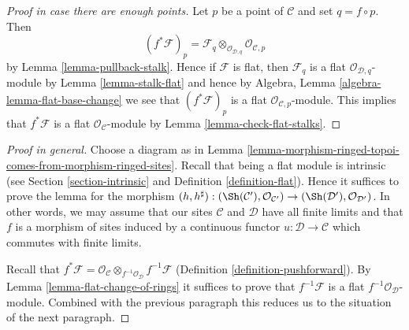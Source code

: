 \begin{proof}[Proof in case there are enough points]
Let $p$ be a point of $\mathcal{C}$ and set $q = f \circ p$. Then
$$
(f^*\mathcal{F})_p =
\mathcal{F}_q \otimes_{\mathcal{O}_{\mathcal{D}, q}}
\mathcal{O}_{\mathcal{C}, p}
$$
by
Lemma \ref{lemma-pullback-stalk}.
Hence if $\mathcal{F}$ is flat, then $\mathcal{F}_q$ is a flat
$\mathcal{O}_{\mathcal{D}, q}$-module by
Lemma \ref{lemma-stalk-flat}
and hence by
Algebra, Lemma \ref{algebra-lemma-flat-base-change}
we see that $(f^*\mathcal{F})_p$ is a flat
$\mathcal{O}_{\mathcal{C}, p}$-module.
This implies that $f^*\mathcal{F}$ is a flat
$\mathcal{O}_\mathcal{C}$-module by
Lemma \ref{lemma-check-flat-stalks}.
\end{proof}

\begin{proof}[Proof in general]
Choose a diagram as in
Lemma \ref{lemma-morphism-ringed-topoi-comes-from-morphism-ringed-sites}.
Recall that being a flat module is intrinsic
(see Section \ref{section-intrinsic} and
Definition \ref{definition-flat}).
Hence it suffices to prove the lemma for
the morphism $(h, h^\sharp) :
(\Sh(\mathcal{C}'), \mathcal{O}_{\mathcal{C}'})
\to
(\Sh(\mathcal{D}'), \mathcal{O}_{\mathcal{D}'})$.
In other words, we may assume that
our sites $\mathcal{C}$ and $\mathcal{D}$
have all finite limits and that $f$ is a morphism
of sites induced by a continuous functor $u : \mathcal{D} \to \mathcal{C}$
which commutes with finite limits.

\medskip\noindent
Recall that $f^*\mathcal{F} =
\mathcal{O}_\mathcal{C} \otimes_{f^{-1}\mathcal{O}_\mathcal{D}}
f^{-1}\mathcal{F}$ (Definition \ref{definition-pushforward}).
By Lemma \ref{lemma-flat-change-of-rings} it suffices to
prove that $f^{-1}\mathcal{F}$ is a flat
$f^{-1}\mathcal{O}_\mathcal{D}$-module. Combined with
the previous paragraph this reduces us to the situation
of the next paragraph.


\end{proof}
